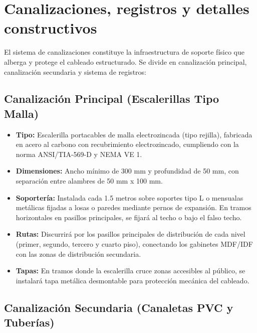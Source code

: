 \section{Canalizaciones, registros y detalles constructivos}

El sistema de canalizaciones constituye la infraestructura de soporte físico que alberga y protege el cableado estructurado. Se divide en canalización principal, canalización secundaria y sistema de registros:

\subsection*{Canalización Principal (Escalerillas Tipo Malla)}

\begin{itemize}
    \item \textbf{Tipo:} Escalerilla portacables de malla electrozincada (tipo rejilla), fabricada en acero al carbono con recubrimiento electrozincado, cumpliendo con la norma ANSI/TIA-569-D y NEMA VE 1.
    \item \textbf{Dimensiones:} Ancho mínimo de 300 mm y profundidad de 50 mm, con separación entre alambres de 50 mm x 100 mm.
    \item \textbf{Soportería:} Instalada cada 1.5 metros sobre soportes tipo L o mensualas metálicas fijadas a losas o paredes mediante pernos de expansión. En tramos horizontales en pasillos principales, se fijará al techo o bajo el falso techo.
    \item \textbf{Rutas:} Discurrirá por los pasillos principales de distribución de cada nivel (primer, segundo, tercero y cuarto piso), conectando los gabinetes MDF/IDF con las zonas de distribución secundaria.
    \item \textbf{Tapas:} En tramos donde la escalerilla cruce zonas accesibles al público, se instalará tapa metálica desmontable para protección mecánica del cableado.
\end{itemize}

\subsection*{Canalización Secundaria (Canaletas PVC y Tuberías)}

